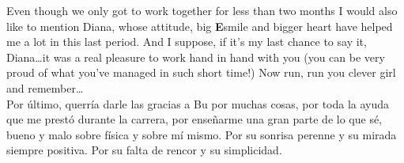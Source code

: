 Even though we only got to work together for less than two months I would also like to mention Diana, whose attitude, big \textbf{E}smile and bigger heart have helped me a lot in this last period.
And I suppose, if it's my last chance to say it, Diana\dots it was a real pleasure to work hand in hand with you (you can be very proud of what you've managed in such short time!) Now run, run you clever girl and remember\dots\\



Por último, querría darle las gracias a Bu por muchas cosas, por toda la ayuda que me prestó durante la carrera, por enseñarme una gran parte de lo que sé, bueno y malo sobre física y sobre mí mismo. Por su sonrisa perenne y su mirada siempre positiva. Por su falta de rencor y su simplicidad.\\
